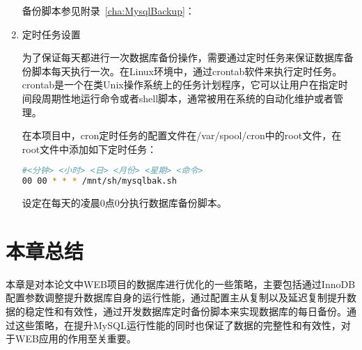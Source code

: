 \begin{enumerate}
备份脚本参见附录~\ref{cha:MysqlBackup}：


\item 定时任务设置

为了保证每天都进行一次数据库备份操作，需要通过定时任务来保证数据库备份脚本每天执行一次。在Linux环境中，通过crontab软件来执行定时任务。crontab是一个在类Unix操作系统上的任务计划程序，它可以让用户在指定时间段周期性地运行命令或者shell脚本，通常被用在系统的自动化维护或者管理。

在本项目中，cron定时任务的配置文件在/var/spool/cron中的root文件，在root文件中添加如下定时任务：
\begin{lstlisting}[language=sh,numbers=none]
#<分钟> <小时> <日> <月份> <星期> <命令>
00 00 * * * /mnt/sh/mysqlbak.sh
\end{lstlisting}
设定在每天的凌晨0点0分执行数据库备份脚本。
\end{enumerate}
\section{本章总结}

本章是对本论文中WEB项目的数据库进行优化的一些策略，主要包括通过InnoDB配置参数调整提升数据库自身的运行性能，通过配置主从复制以及延迟复制提升数据的稳定性和有效性，通过开发数据库定时备份脚本来实现数据库的每日备份。通过这些策略，在提升MySQL运行性能的同时也保证了数据的完整性和有效性，对于WEB应用的作用至关重要。